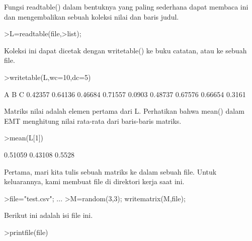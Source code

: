 \documentclass[a4paper,10pt]{article}
\begin{document}
\begin{eulernotebook}
\begin{eulercomment}
\begin{eulercomment}
\begin{eulercomment}
\begin{eulercomment}
\begin{eulercomment}
\begin{eulercomment}
\begin{eulercomment}
\begin{eulercomment}
\begin{eulercomment}
\begin{eulercomment}
\begin{eulercomment}
\begin{eulercomment}
\begin{eulercomment}
\begin{eulercomment}
\begin{eulercomment}
\begin{eulercomment}
\begin{eulercomment}
\begin{eulercomment}
\begin{eulercomment}
\begin{eulercomment}
\begin{eulercomment}
\begin{eulercomment}
\begin{eulercomment}
\begin{eulercomment}
\begin{euleroutput}
\end{euleroutput}
\begin{eulercomment}
Fungsi readtable() dalam bentuknya yang paling sederhana dapat membaca
ini dan mengembalikan sebuah koleksi nilai dan baris judul.
\end{eulercomment}
\begin{eulerprompt}
>L=readtable(file,>list);
\end{eulerprompt}
\begin{eulercomment}
Koleksi ini dapat dicetak dengan writetable() ke buku catatan, atau ke
sebuah file.
\end{eulercomment}
\begin{eulerprompt}
>writetable(L,wc=10,dc=5)
\end{eulerprompt}
\begin{euleroutput}
           A         B         C
     0.42357   0.64136   0.46684
     0.71557    0.0903   0.48737
     0.67576   0.66654    0.3161
\end{euleroutput}
\begin{eulercomment}
Matriks nilai adalah elemen pertama dari L. Perhatikan bahwa mean()
dalam EMT menghitung nilai rata-rata dari baris-baris matriks.
\end{eulercomment}
\begin{eulerprompt}
>mean(L[1])
\end{eulerprompt}
\begin{euleroutput}
    0.51059 
    0.43108 
     0.5528 
\end{euleroutput}
\begin{eulercomment}
Pertama, mari kita tulis sebuah matriks ke dalam sebuah file. Untuk
keluarannya, kami membuat file di direktori kerja saat ini.
\end{eulercomment}
\begin{eulerprompt}
>file="test.csv";  ...
>M=random(3,3); writematrix(M,file);
\end{eulerprompt}
\begin{eulercomment}
Berikut ini adalah isi file ini.
\end{eulercomment}
\begin{eulerprompt}
>printfile(file)
\end{eulerprompt}

\end{eulercomment}
\end{eulercomment}
\end{eulercomment}
\end{eulercomment}
\end{eulercomment}
\end{eulercomment}
\end{eulercomment}
\end{eulercomment}
\end{eulercomment}
\end{eulercomment}
\end{eulercomment}
\end{eulercomment}
\end{eulercomment}
\end{eulercomment}
\end{eulercomment}
\end{eulercomment}
\end{eulercomment}
\end{eulercomment}
\end{eulercomment}
\end{eulercomment}
\end{eulercomment}
\end{eulercomment}
\end{eulercomment}
\end{eulercomment}
\end{eulernotebook}
\end{document}
